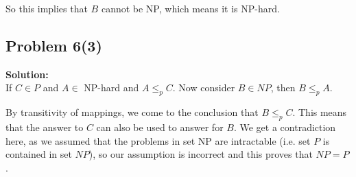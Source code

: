 \documentclass[12pt,a4paper]{article}
\newcommand{\solution}{\noindent\textbf{Solution:}\\\indent}
\begin{document}
So this implies that $B$ cannot be NP, which means it is NP-hard.

\subsection*{Problem 6(3)}
\solution
If $C \in P$ and $A \in$ NP-hard and $A \leq_p C$. Now consider $B \in NP$, then $B \leq_p A$.

By transitivity of mappings, we come to the conclusion that $B \leq_p C$. This means that the answer to $C$ can also be used to answer for $B$. We get a contradiction here, as we assumed that the problems in set NP are intractable (i.e. set $P$ is contained in set $NP$), so our assumption is incorrect and this proves that $NP = P$.
\end{document}

